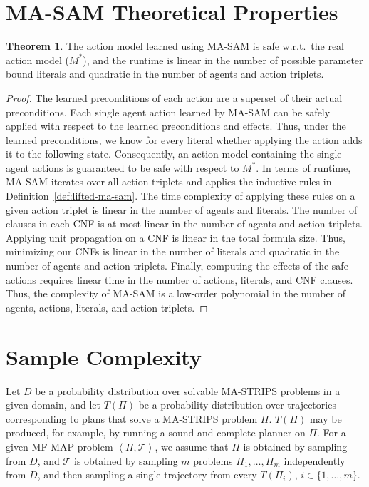 \documentclass[letterpaper]{article} %
\theoremstyle{definition}
\newtheorem{theorem}{Theorem}
\theoremstyle{remark}
\newcommand{\tuple}[1]{\ensuremath{\left \langle #1 \right \rangle }}
\newcommand{\realm}{\ensuremath{M^*}\xspace}
\newcommand{\masam}{\ac{MA-SAM}\xspace}
\newcommand{\mfmap}{\ac{MF-MAP}\xspace}
\newcommand{\argaman}[1]{{\textcolor{blue}{[Argaman: #1]}}}
\begin{document}
\section{MA-SAM Theoretical Properties}
\begin{theorem}
\label{lemma:ma-sam}
The action model learned using \masam is safe w.r.t.\  the real action model (\realm), and the runtime is linear in the number of possible parameter bound literals and quadratic in the number of agents and action triplets. 
\end{theorem}
\begin{proof}
The learned preconditions of each action are a superset of their actual preconditions. Each single agent action learned by \masam can be safely applied with respect to the learned preconditions and effects. 
Thus, under the learned preconditions, we know for every literal whether applying the action adds it to the following state. 
Consequently, an action model containing the single agent actions is guaranteed to be safe with respect to \realm. 
In terms of runtime, \masam iterates over all action triplets and applies the inductive rules in Definition~\ref{def:lifted-ma-sam}. 
The time complexity of applying these rules on a given action triplet is linear in the number of agents and literals. 
The number of clauses in each CNF is at most linear in the number of agents and action triplets. 
Applying unit propagation on a CNF is linear in the total formula size. 
Thus, minimizing our CNFs is linear in the number of literals and quadratic in the number of agents and action triplets. 
Finally, computing the effects of the safe actions requires linear time in the number of actions, literals, and CNF clauses. 
Thus, the complexity of \masam is a low-order polynomial in the number of agents, actions, literals, and action triplets. 
\end{proof}


\section{Sample Complexity}
Let $D$ be a probability distribution over solvable MA-STRIPS problems in a given domain, 
and let $T(\Pi)$ be a probability distribution over trajectories corresponding to plans that solve 
a MA-STRIPS problem $\Pi$.  
$T(\Pi)$ may be produced, for example, by running a sound and complete planner on $\Pi$. 
For a given \mfmap problem $\tuple{\Pi, \mathcal{T}}$, we assume that $\Pi$ is obtained by sampling from $D$, 
and $\mathcal{T}$ is obtained by sampling $m$ problems $\Pi_1,\ldots,\Pi_m$ independently from $D$, and then sampling a single trajectory from every $T(\Pi_i)$, $i\in\{1,\ldots, m\}$. 
\end{document}
